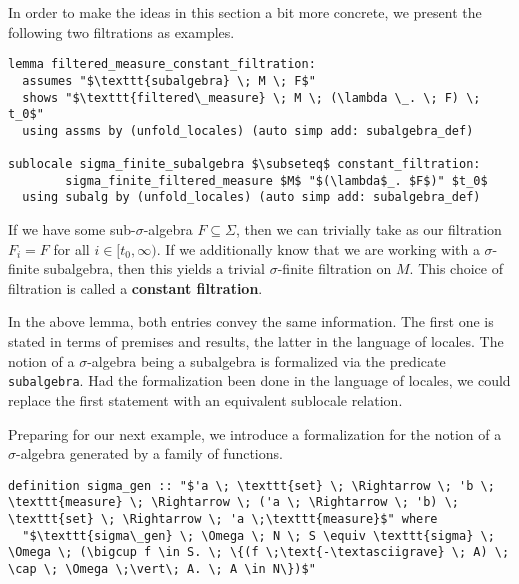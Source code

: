 In order to make the ideas in this section a bit more concrete, we present the following two filtrations as examples.

\begin{isalemma}
{\small
\begin{lstlisting}[style=isabelle]
lemma filtered_measure_constant_filtration:
  assumes "$\texttt{subalgebra} \; M \; F$"
  shows "$\texttt{filtered\_measure} \; M \; (\lambda \_. \; F) \; t_0$"
  using assms by (unfold_locales) (auto simp add: subalgebra_def)

sublocale sigma_finite_subalgebra $\subseteq$ constant_filtration: 
		sigma_finite_filtered_measure $M$ "$(\lambda$_. $F$)" $t_0$
  using subalg by (unfold_locales) (auto simp add: subalgebra_def)
\end{lstlisting}
}
\end{isalemma}

If we have some sub-$\sigma$-algebra $F \subseteq \Sigma$, then we can trivially take as our filtration $F_i = F$ for all $i \in [t_0,\infty)$. If we additionally know that we are working with a $\sigma$-finite subalgebra, then this yields a trivial $\sigma$-finite filtration on $M$. This choice of filtration is called a \textbf{constant filtration}. 

\begin{remark}
	In the above lemma, both entries convey the same information. The first one is stated in terms of premises and results, the latter in the language of locales. The notion of a $\sigma$-algebra being a subalgebra is formalized via the predicate \texttt{subalgebra}. Had the formalization been done in the language of locales, we could replace the first statement with an equivalent sublocale relation.
\end{remark}

Preparing for our next example, we introduce a formalization for the notion of a $\sigma$-algebra generated by a family of functions.

\begin{isadefinition}
{\small
\begin{lstlisting}[style=isabelle]
definition sigma_gen :: "$'a \; \texttt{set} \; \Rightarrow \; 'b \; \texttt{measure} \; \Rightarrow \; ('a \; \Rightarrow \; 'b) \; \texttt{set} \; \Rightarrow \; 'a \;\texttt{measure}$" where
  "$\texttt{sigma\_gen} \; \Omega \; N \; S \equiv \texttt{sigma} \; \Omega \; (\bigcup f \in S. \; \{(f \;\text{-\textasciigrave} \; A) \; \cap \; \Omega \;\vert\; A. \; A \in N\})$"
\end{lstlisting}
}
\end{isadefinition}

